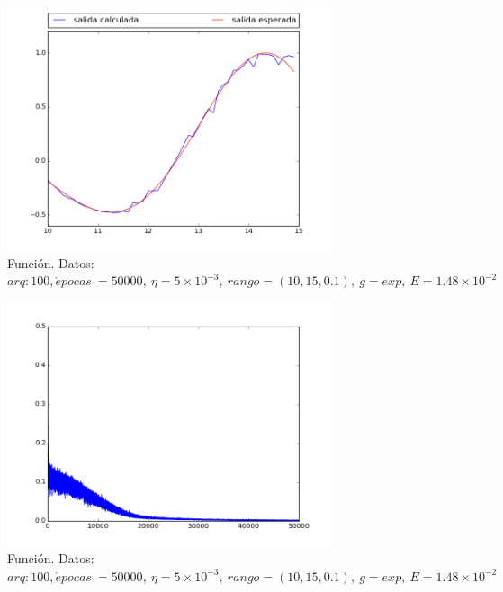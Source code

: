 \documentclass[12pt,a4paper]{article}
\begin{document}
\begin{figure}[H]
\centering
\includegraphics[width=0.85\textwidth]{img/_100_-eta_0_005-FUNCTION.png}
\caption{\label{fig:test10-15-tanh-fn-100} Función. Datos:  $arq: 100, \acute{e} pocas \ = 50000, \ \eta = 5 \times 10^{-3},\ rango=(10, 15, 0.1),\ g=exp, \ E = 1.48 \times 10^{-2}$}
\end{figure}

\begin{figure}[H]
\centering
\includegraphics[width=0.85\textwidth]{img/_100_-eta_0_005-ERROR.png}
\caption{\label{fig:test10-15-tanh-error-100} Función. Datos:  $arq: 100, \acute{e} pocas \ = 50000, \ \eta = 5 \times 10^{-3},\ rango=(10, 15, 0.1),\ g=exp, \ E = 1.48 \times 10^{-2}$}
\end{figure}
\end{document}
